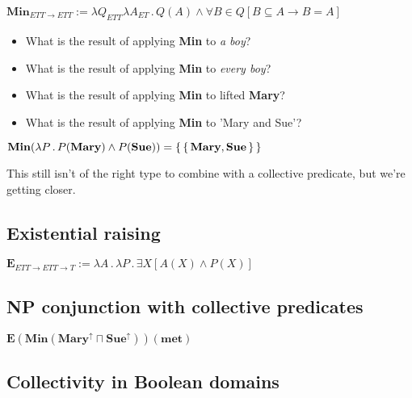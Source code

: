 \documentclass[letterpaper,parskip=half]{scrartcl}
\begin{document}
\begin{exe}
\ex \(\mathbf{Min}_{ETT \rightarrow ETT} := \lambda Q_{ETT}_{}\lambda A_{ET}\,.\, Q(A) \wedge \forall B \in Q[B \subseteq A \rightarrow B = A]\)
\label{orgc2f0664}
\end{exe}

\begin{itemize}
\item What is the result of applying \textbf{Min} to \emph{a boy}?
\item What is the result of applying \textbf{Min} to \emph{every boy}?
\item What is the result of applying \textbf{Min} to lifted \textbf{Mary}?
\item What is the result of applying \textbf{Min} to 'Mary and Sue'?
\end{itemize}

\begin{exe}
\ex \(\mathbf{Min}(\lambda P\,.\,P(\mathbf{Mary}) \wedge P(\mathbf{Sue})) = \set{\set{\mathbf{Mary},\mathbf{Sue}}}\)
\label{org5f07592}
\end{exe}

This still isn't of the right type to combine with a collective predicate, but we're getting closer.

\subsection{Existential raising}
\label{sec:orgc7f7afc}

\begin{exe}
\ex \(\mathbf{E}_{ETT \rightarrow ETT \to T} := \lambda A\,.\,\lambda P\,.\,\exists X[A(X) \wedge P(X)]\)
\label{org38878ae}
\end{exe}

\subsection{NP conjunction with collective predicates}
\label{sec:orgcba5a45}

\begin{exe}
\ex \(\mathbf{E}(\mathbf{Min}(\mathbf{Mary}^\uparrow \sqcap \mathbf{Sue}^\uparrow))(\mathbf{met})\)
\label{orgb670f0f}
\end{exe}

\subsection{Collectivity in Boolean domains}
\label{sec:org577b18e}
\end{document}
